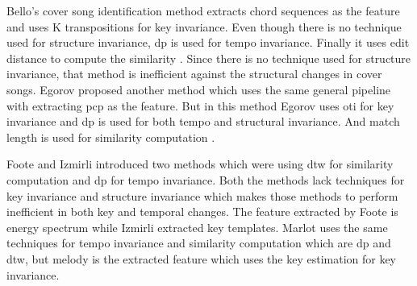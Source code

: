 Bello's cover song identification method extracts chord sequences as the feature and
uses K transpositions for key invariance. Even though there is no technique used
for structure invariance, \gls{dp} is used for tempo invariance. Finally
it uses edit distance to compute the similarity \cite{Chord}. Since there is no technique
used for structure invariance, that method is inefficient against the structural changes
in cover songs. Egorov proposed another method which uses the same general pipeline with
extracting \gls{pcp} as the feature. But in this method Egorov uses \gls{oti} for key
invariance and \gls{dp} is used for both tempo and structural invariance. And match length
is used for similarity computation \cite{PCP}.

Foote \cite{Energy} and Izmirli \cite{KeyTemplates} introduced two methods which were using
\gls{dtw} for similarity computation and \gls{dp} for tempo invariance. Both the methods lack
techniques for key invariance and structure invariance which makes those methods to perform
inefficient in both key and temporal changes. The feature extracted by Foote is energy spectrum
while Izmirli extracted key templates. Marlot uses the same techniques for tempo invariance and
similarity computation which are \gls{dp} and \gls{dtw}, but melody is the extracted feature
which uses the key estimation for key invariance.

